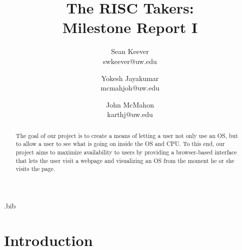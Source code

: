 \usepackage{filecontents}

\usepackage{graphicx}
\usepackage{float}
\graphicspath{ {../images/}}

\begin{filecontents}{\jobname.bib}

\end{filecontents}



\date{}

\title{\Large \bf The RISC Takers:\\
  Milestone Report I}

\author{
  {\rm Sean Keever} \\
  swkeever@uw.edu
  \and
  {\rm Yokesh Jayakumar} \\
  mcmahjoh@uw.edu
  \and
  {\rm John McMahon} \\
  karthj@uw.edu
} %

\maketitle

\begin{abstract}
  The goal of our project is to create a means of letting a user not only use an OS,
  but to allow a user to see what is going on inside the OS and CPU.
  To this end, our project aims to maximize availability to users by
  providing a browser-based interface that lets the user visit a webpage and 
  visualizing an OS from the moment he or she visits the page.
\end{abstract}

\section{Introduction}

